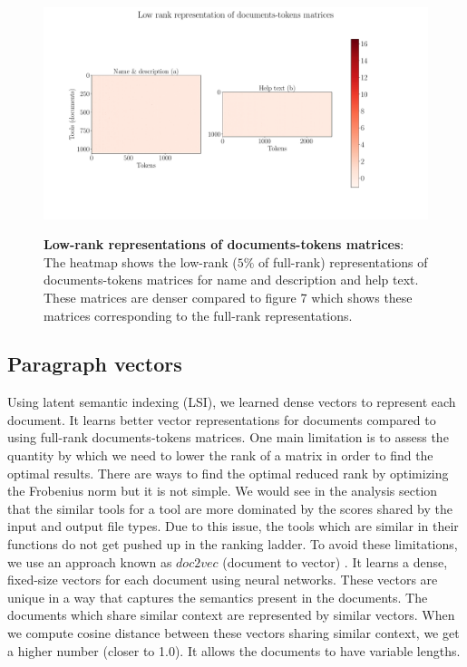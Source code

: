 \begin{figure}[h]
\begin{centering}
    {\includegraphics[scale=0.35]{figures/Document_tokens_low_rank.pdf}}
    \caption[Low-rank representations of documents-tokens matrices]{\textbf{Low-rank representations of documents-tokens matrices}: The heatmap shows the low-rank ($5\%$ of full-rank) representations of documents-tokens matrices for name and description and help text. These matrices are denser compared to figure 7 which shows these matrices corresponding to the full-rank representations.}
\end{centering}
\end{figure}

\subsection{Paragraph vectors}
Using latent semantic indexing (LSI), we learned dense vectors to represent each document. It learns better vector representations for documents compared to using full-rank documents-tokens matrices. One main limitation is to assess the quantity by which we need to lower the rank of a matrix in order to find the optimal results. There are ways to find the optimal reduced rank by optimizing the Frobenius norm but it is not simple. We would see in the analysis section that the similar tools for a tool are more dominated by the scores shared by the input and output file types. Due to this issue, the tools which are similar in their functions do not get pushed up in the ranking ladder. To avoid these limitations, we use an approach known as $doc2vec$ (document to vector) \cite{DBLP:journals/corr/LeM14}. It learns a dense, fixed-size vectors for each document using neural networks. These vectors are unique in a way that captures the semantics present in the documents. The documents which share similar context are represented by similar vectors. When we compute cosine distance between these vectors sharing similar context, we get a higher number (closer to 1.0). It allows the documents to have variable lengths.


